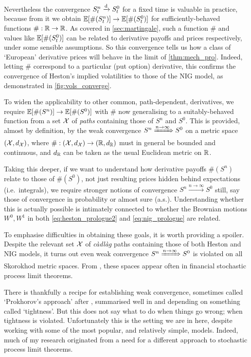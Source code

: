 Nevertheless the convergence $S^n_t\xrightarrow{\mathrm{d}} S^0_t$ for a fixed time is valuable in practice, because from it we obtain $\mathbb{E}[\#(S^n_t)]\to\mathbb{E}[\#(S^0_t)]$ for sufficiently-behaved functions $\#:\mathbb{R}\to\mathbb{R}$. As covered in \autoref{sec:martingale}, such a function $\#$ and values like $\mathbb{E}[\#(S^0_t)]$ can be related to derivative payoffs and prices respectively, under some sensible assumptions. So this convergence tells us how a class of `European' derivative prices will behave in the limit of \autoref{thm:mech_pro}. Indeed, letting $\#$ correspond to a particular (put option) derivative, this confirms the convergence of Heston's implied volatilities to those of the NIG model, as demonstrated in \autoref{fig:vols_converge}.

To widen the applicability to other common, path-dependent, derivatives, we require $\mathbb{E}[\#(S^n)]\to\mathbb{E}[\#(S^0)]$ with $\#$ now generalising to a suitably-behaved function from a set $\mathcal{X}$ of \emph{paths} containing those of $S^n$ and $S^0$. This is provided, almost by definition, by the weak convergence $S^n\xRightarrow{n\to\infty} S^0$ on a metric space $(\mathcal{X},d_{\mathcal{X}})$, where $\#:(\mathcal{X},d_{\mathcal{X}})\to(\mathbb{R},d_{\mathbb{R}})$ must in general be bounded and continuous, and $d_{\mathbb{R}}$ can be taken as the usual Euclidean metric on $\mathbb{R}$.

Taking this deeper, if we want to understand how derivative payoffs $\#(S^n)$ relate to those of $\#(S^0)$, not just resulting prices hidden behind expectations (i.e.~integrals), we require stronger notions of convergence $S^n\xrightarrow{n\to\infty} S^0$ still, say those of convergence in probability or almost sure (a.s.). Understanding whether this is actually possible is intimately connected to whether the Brownian motions $W^0,W^1$ in both \autoref{eq:heston_prologue2} and \autoref{eq:nig_prologue} are related.

To emphasise difficulties in obtaining these goals, it is worth providing a spoiler. Despite the relevant set $\mathcal{X}$ of \emph{c\`adl\`ag} paths containing those of both Heston and NIG models, it turns out even weak convergence $S^n\xRightarrow{n\to\infty} S^0$ is violated on all Skorokhod metric spaces. From \cite{skorokhod_1956}, these spaces appear often in financial stochastic process limit theorems.

There is thankfully a recipe for establishing weak convergence, sometimes called `Prokhorov's approach' after \cite{prokhorov_1956}, summarised well in \cite{jacod_2003} and depending on something called `tightness'. But this does not say what to do when things go wrong; when tightness is violated. Unfortunately this is the setting we are in here, despite working with some of the most popular, and relatively simple, models. Indeed, much of my research originated from a need for a different approach to stochastic process limit theorems.

